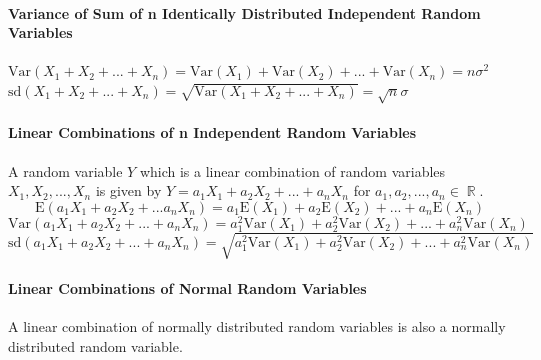 \documentclass[a4paper,twoside,10pt]{article}
\DeclareMathOperator\R{\mathbb{R}}
\begin{document}
			\paragraph{Variance of Sum of n Identically Distributed Independent Random Variables} $\displaystyle\mathrm{Var}(X_1+X_2+...+X_n)=\mathrm{Var}(X_1)+\mathrm{Var}(X_2)+...+\mathrm{Var}(X_n)=n\sigma^2$\\
			$\displaystyle\mathrm{sd}(X_1+X_2+...+X_n)=\sqrt{\mathrm{Var}(X_1+X_2+...+X_n)}=\sqrt{n}\sigma$
			
			\paragraph{Linear Combinations of n Independent Random Variables} A random variable $Y$ which is a linear combination of random variables $X_1,X_2,...,X_n$ is given by $Y=a_1X_1+a_2X_2+...+a_nX_n$ for $a_1,a_2,...,a_n\in\R$.
			\[
				\mathrm{E}(a_1X_1+a_2X_2+...a_nX_n)=a_1\mathrm{E}(X_1)+a_2\mathrm{E}(X_2)+...+a_n\mathrm{E}(X_n)
			\]
			\[
				\mathrm{Var}(a_1X_1+a_2X_2+...+a_nX_n)=a_1^2\mathrm{Var}(X_1)+a_2^2\mathrm{Var}(X_2)+...+a_n^2\mathrm{Var}(X_n)
			\]
			\[
				\mathrm{sd}(a_1X_1+a_2X_2+...+a_nX_n)=\sqrt{a_1^2\mathrm{Var}(X_1)+a_2^2\mathrm{Var}(X_2)+...+a_n^2\mathrm{Var}(X_n)}
			\]
		
			\paragraph{Linear Combinations of Normal Random Variables} A linear combination of normally distributed random variables is also a normally distributed random variable.
\end{document}
